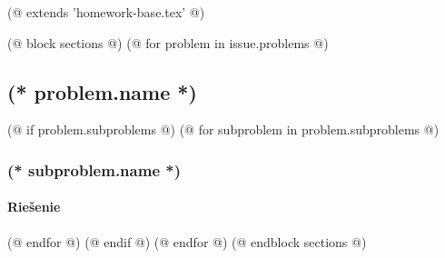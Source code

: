 (@ extends 'homework-base.tex' @)

(@ block sections @)
    (@ for problem in issue.problems @)
        \subsection{(* problem.name *)}
        (@ if problem.subproblems @)
            (@ for subproblem in problem.subproblems @)
                \subsubsection{(* subproblem.name *)}
                \paragraph{Riešenie}
            (@ endfor @)
        (@ endif @)
    (@ endfor @)
(@ endblock sections @)
